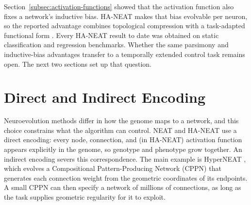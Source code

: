 Section~\ref{subsec:activation-functions} showed that the activation function also fixes a network's inductive bias.
HA-NEAT makes that bias evolvable per neuron, so the reported advantage combines topological compression with a task-adapted functional form \parencite{papavasileiou_optimizing_2022}.
Every HA-NEAT result to date was obtained on static classification and regression benchmarks.
Whether the same parsimony and inductive-bias advantages transfer to a temporally extended control task remains open. The next two sections set up that question.


\section{Direct and Indirect Encoding}
\label{subsec:direct-and-indirect-encoding}


Neuroevolution methods differ in how the genome maps to a network, and this choice constrains what the algorithm can control.
NEAT and HA-NEAT use a direct encoding: every node, connection, and (in HA-NEAT) activation function appears explicitly in the genome, so genotype and phenotype grow together.
An indirect encoding severs this correspondence.
The main example is HyperNEAT \parencite{stanley_hypercubebased_2009}, which evolves a Compositional Pattern-Producing Network (CPPN) \parencite{stanley_compositional_2007} that generates each connection weight from the geometric coordinates of its endpoints.
A small CPPN can then specify a network of millions of connections, as long as the task supplies geometric regularity for it to exploit.

